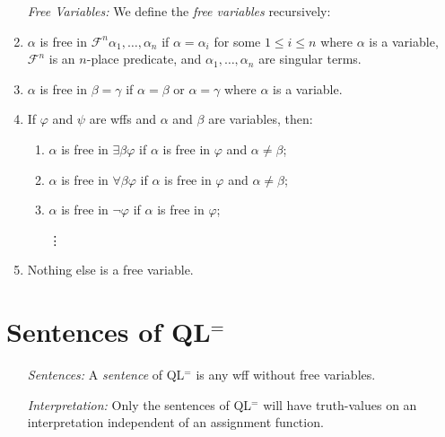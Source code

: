 \documentclass[a4paper, 11pt]{article} %
\begin{document}
\begin{enumerate}
  \item[\it Free Variables:] We define the \textit{free variables} recursively:
  \item $\alpha$ is free in $\mathcal{F}^n\alpha_1,\ldots,\alpha_n$ if $\alpha=\alpha_i$ for some $1\leq i\leq n$ where $\alpha$ is a variable, $\mathcal{F}^n$ is an $n$-place predicate, and $\alpha_1,\ldots,\alpha_n$ are singular terms.
  \item $\alpha$ is free in $\beta=\gamma$ if $\alpha=\beta$ or $\alpha=\gamma$ where $\alpha$ is a variable.
  \item If $\varphi$ and $\psi$ are wffs and $\alpha$ and $\beta$ are variables, then:
    \begin{enumerate}
        \item $\alpha$ is free in $\exists\beta\varphi$ if $\alpha$ is free in $\varphi$ and $\alpha\neq\beta$;
        \item $\alpha$ is free in $\forall\beta\varphi$ if $\alpha$ is free in $\varphi$ and $\alpha\neq\beta$;
        \item $\alpha$ is free in $\neg\varphi$ if $\alpha$ is free in $\varphi$;
        \item[\vdots] ~
    \end{enumerate}
  \item Nothing else is a free variable. 
\end{enumerate}





\section*{Sentences of QL$^=$}

\begin{enumerate}
  \item[\it Sentences:] A \textit{sentence} of QL$^=$ is any wff without free variables.
  \item[\it Interpretation:] Only the sentences of QL$^=$ will have truth-values on an interpretation independent of an assignment function.
\end{enumerate}
\end{document}
